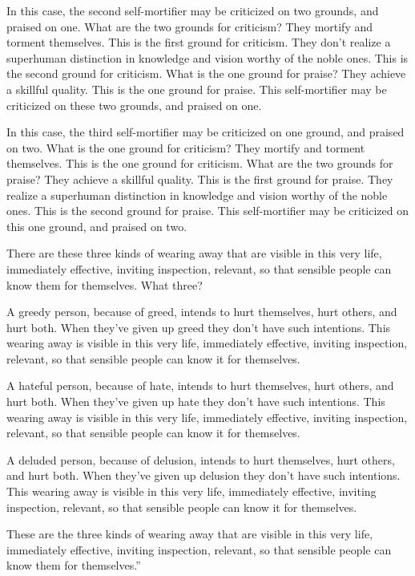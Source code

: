 \documentclass[12pt,openany]{book}%
\begin{document}
In this case, the second self-mortifier may be criticized on two grounds, and praised on one. What are the two grounds for criticism? They mortify and torment themselves. This is the first ground for criticism. They don’t realize a superhuman distinction in knowledge and vision worthy of the noble ones. This is the second ground for criticism. What is the one ground for praise? They achieve a skillful quality. This is the one ground for praise. This self-mortifier may be criticized on these two grounds, and praised on one. 

In this case, the third self-mortifier may be criticized on one ground, and praised on two. What is the one ground for criticism? They mortify and torment themselves. This is the one ground for criticism. What are the two grounds for praise? They achieve a skillful quality. This is the first ground for praise. They realize a superhuman distinction in knowledge and vision worthy of the noble ones. This is the second ground for praise. This self-mortifier may be criticized on this one ground, and praised on two. 

There are these three kinds of wearing away that are visible in this very life, immediately effective, inviting inspection, relevant, so that sensible people can know them for themselves. What three? 

A greedy person, because of greed, intends to hurt themselves, hurt others, and hurt both. When they’ve given up greed they don’t have such intentions. This wearing away is visible in this very life, immediately effective, inviting inspection, relevant, so that sensible people can know it for themselves. 

A hateful person, because of hate, intends to hurt themselves, hurt others, and hurt both. When they’ve given up hate they don’t have such intentions. This wearing away is visible in this very life, immediately effective, inviting inspection, relevant, so that sensible people can know it for themselves. 

A deluded person, because of delusion, intends to hurt themselves, hurt others, and hurt both. When they’ve given up delusion they don’t have such intentions. This wearing away is visible in this very life, immediately effective, inviting inspection, relevant, so that sensible people can know it for themselves. 

These are the three kinds of wearing away that are visible in this very life, immediately effective, inviting inspection, relevant, so that sensible people can know them for themselves.” 
\end{document}
